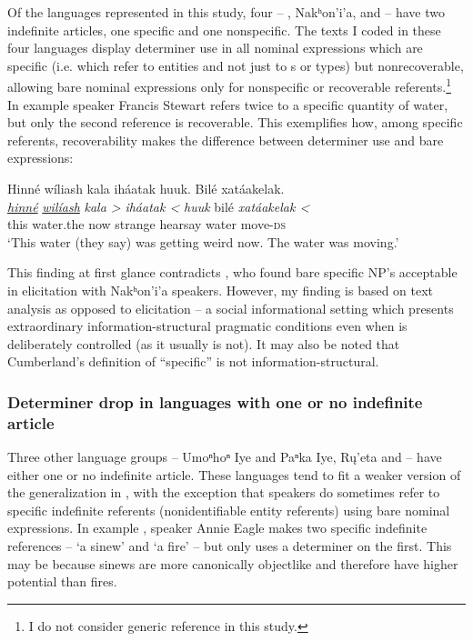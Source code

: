 \documentclass[output=paper]{LSP/langsci}
\begin{document}
Of the languages represented in this study, four -- , Nakʰon’i’a,  and  -- have two indefinite articles, one specific and one nonspecific. The texts I coded in these four languages display determiner use in all nominal expressions which are specific (i.e. which refer to entities and not just to s or types) but nonrecoverable, allowing bare nominal expressions only for nonspecific or recoverable referents.\footnote{I do not consider generic reference in this study.} In example   speaker Francis Stewart refers twice to a specific quantity of water, but only the second reference is recoverable. This exemplifies how, among specific referents, recoverability makes the difference between determiner use and bare expressions:

\ea\label{stewartdrop}
Hinné wíliash kala iháatak huuk. Bilé xatáakelak.\footnotemark\\
\gll	\emph{\underline{hinné}} 	\emph{\underline{wilíash}} 		\emph{kala >} 	\emph{iháatak <}		\emph{huuk} 	bilé 		\emph{xatáakelak <}\\
	this 				water.the 					now 			strange 			hearsay 		water		move-\textsc{ds}\\
\glt	`This water (they say) was getting weird now. The water was moving.'
\z

This finding at first glance contradicts \citet{Cumberland2005}, who found bare specific NP’s acceptable in elicitation with Nakʰon’i’a speakers. However, my finding is based on text analysis as opposed to elicitation -- a social informational setting which presents extraordinary information-structural pragmatic conditions even when  is deliberately controlled (as it usually is not). It may also be noted that Cumberland’s definition of “specific” is not information-structural.

\subsubsection{Determiner drop in languages with one or no indefinite article}\label{droponeindef}

Three other language groups -- Umoⁿhoⁿ Iye and Paⁿka Iye, Rų’eta and  -- have either one or no indefinite article. These languages tend to fit a weaker version of the generalization in , with the exception that speakers do sometimes refer to specific indefinite referents (nonidentifiable entity referents) using bare nominal expressions. In example ,  speaker Annie Eagle makes two specific indefinite references -- `a sinew' and `a fire' -- but only uses a determiner on the first. This may be because sinews are more canonically objectlike and therefore have higher  potential than fires.
\end{document}
